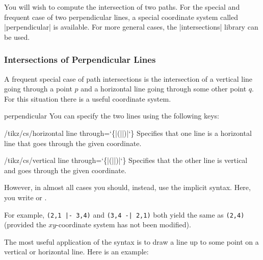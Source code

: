 You will wish to compute the intersection of two paths. For the special and
frequent case of two perpendicular lines, a special coordinate system called
|perpendicular| is available. For more general cases, the |intersections|
library can be used.


\subsubsection{Intersections of Perpendicular Lines}

A frequent special case of path intersections is the intersection of a vertical
line going through a point $p$ and a horizontal line going through some other
point $q$. For this situation there is a useful coordinate system.

\begin{coordinatesystem}{perpendicular}
    You can specify the two lines using the following keys:

    \begin{key}{/tikz/cs/horizontal line through={\ttfamily\char`\{}|(||)|{\ttfamily\char`\}}}
        Specifies that one line is a horizontal line that goes through the
        given coordinate.
    \end{key}
    \begin{key}{/tikz/cs/vertical line through={\ttfamily\char`\{}|(||)|{\ttfamily\char`\}}}
        Specifies that the other line is vertical and goes through the given
        coordinate.
    \end{key}

    However, in almost all cases you should, instead, use the implicit syntax.
    Here, you write  or
    .

    For example, \verb!(2,1 |- 3,4)! and  \verb!(3,4 -| 2,1)! both yield the
    same as \verb!(2,4)! (provided the $xy$-co\-or\-di\-nate system has not
    been modified).

    The most useful application of the syntax is to draw a line up to some
    point on a vertical or horizontal line. Here is an example:
\begin{codeexample}[]
\end{codeexample}
\end{coordinatesystem}
